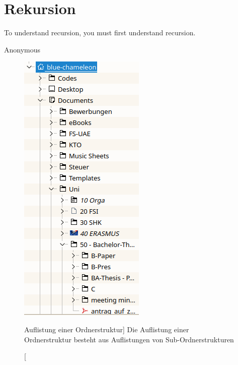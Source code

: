 \chapter{Rekursion} \label{chp:recursion}
\epigraph{To understand recursion, you must first understand recursion.}{Anonymous}

\begin{figure}
	\vspace{-10pt}
	\includegraphics[width=\linewidth]{./gfx/foldertree}
	\caption
	[Auflistung einer Ordnerstruktur]
	{Die Auflistung einer Ordnerstruktur besteht aus Auflistungen von Sub-Ordnerstrukturen}
	\vspace{-90pt}
\end{figure}
